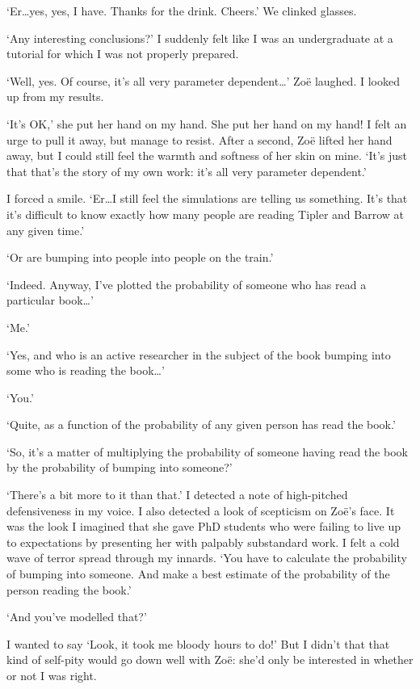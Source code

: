 `Er\dots yes, yes, I have. Thanks for the drink. Cheers.' We clinked
glasses.

`Any interesting conclusions?' I suddenly felt like I was an
undergraduate at a tutorial for which I was not properly prepared.

`Well, yes. Of course, it's all very parameter dependent\dots'
Zoë laughed. I looked up from my results.

`It's OK,' she put her hand on my hand. She put her hand on my hand!
I felt an urge to pull it away, but manage to resist. After a
second, Zoë lifted her hand away, but I could still feel the
warmth and softness of her skin on mine. `It's just that that's the
story of my own work: it's all very parameter dependent.'

I forced a smile. `Er\dots I still feel the simulations are telling
us something. It's that it's difficult to know exactly how many
people are reading Tipler and Barrow at any given time.'

`Or are bumping into people into people on the train.'

`Indeed. Anyway, I've plotted the probability of someone who has
read a particular book\dots'

`Me.'

`Yes, and who is an active researcher in the subject of the book
bumping into some who is reading the book\dots'

`You.'

`Quite, as a function of the probability of any given person has
read the book.'

`So, it's a matter of multiplying the probability of someone having
read the book by the probability of bumping into someone?'

`There's a bit more to it than that.' I detected a note of
high-pitched defensiveness in my voice. I also detected a look of
scepticism on Zoë's face. It was the look I imagined that she
gave PhD students who were failing to live up to expectations by
presenting her with palpably substandard work. I felt a cold wave of
terror spread through my innards. `You have to calculate the
probability of bumping into someone. And make a best estimate of the
probability of the person reading the book.'

`And you've modelled that?'

I wanted to say `Look, it took me bloody hours to do!' But I didn't
that that kind of self-pity would go down well with Zoë: she'd
only be interested in whether or not I was right.


